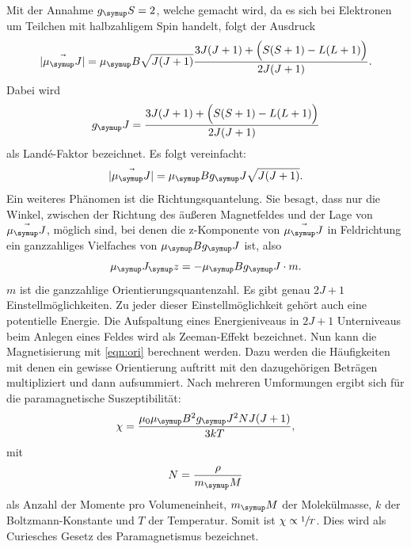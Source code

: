 Mit der Annahme $g_\su{S} = 2$, welche gemacht wird, da es sich bei Elektronen um
Teilchen mit halbzahligem Spin handelt, folgt der Ausdruck
\begin{equation}
  |\vec{\mu_\su{J}}| = \mu_\su{B} \sqrt{J(J+1)} \frac{3J(J+1)+\Big(S(S+1)
  -L(L+1)\Big)}{2J(J+1)}.
\end{equation}
Dabei wird
\begin{equation}
  g_\su{J} = \frac{3J(J+1)+\Big(S(S+1) -L(L+1)\Big)}{2J(J+1)} \label{eqn:lande}
\end{equation}
als Landé-Faktor bezeichnet.
Es folgt vereinfacht:
\begin{equation}
  |\vec{\mu_\su{J}}| = \mu_\su{B} g_\su{J} \sqrt{J(J+1)}.
\end{equation}
Ein weiteres Phänomen ist die Richtungsquantelung. Sie besagt, dass nur die Winkel,
zwischen der Richtung des äußeren Magnetfeldes und der Lage von $\vec{\mu_\su{J}}$,
möglich sind, bei denen die z-Komponente von $\vec{\mu_\su{J}}$ in Feldrichtung
ein ganzzahliges Vielfaches von $\mu_\su{B}g_\su{J}$ ist, also
\begin{equation}
  \mu_\su{J_\su{z}} = -\mu_\su{B}g_\su{J}\cdot m. \label{eqn:ori}
\end{equation}
$m$ ist die ganzzahlige Orientierungsquantenzahl. Es gibt genau $2J+1$
Einstellmöglichkeiten. Zu jeder dieser Einstellmöglichkeit gehört auch eine
potentielle Energie. Die Aufspaltung eines Energieniveaus in $2J+1$ Unterniveaus
beim Anlegen eines Feldes wird als Zeeman-Effekt bezeichnet.
Nun kann die Magnetisierung mit \eqref{eqn:ori} berechnent werden. Dazu werden
die Häufigkeiten mit denen ein gewisse Orientierung auftritt mit den dazugehörigen
Beträgen multipliziert und dann aufsummiert. Nach mehreren Umformungen ergibt
sich für die paramagnetische Suszeptibilität:
\begin{equation}
  \chi = \frac{\mu_0 \mu_\su{B}^2 g_\su{J}^2 N J(J+1)}{3kT}, \label{eqn:chitheo}
\end{equation}
mit
\begin{equation}
  N = \frac{\rho}{m_\su{M}} \label{eqn:momente}
\end{equation}
 als Anzahl der Momente pro Volumeneinheit, $m_\su{M}$ der Molekülmasse, $k$ der Boltzmann-Konstante
 und $T$ der Temperatur. Somit ist $\chi \propto \sfrac{1}{T}$. Dies wird als Curiesches
 Gesetz des Paramagnetismus bezeichnet.

